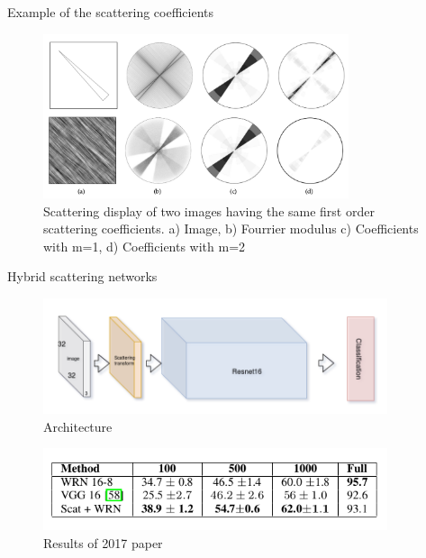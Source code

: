 \documentclass[compress]{beamer}
\begin{document}
	\begin{frame}{Example of the scattering coefficients}
		\begin{figure}[!htb]
			\includegraphics[width=0.8\textwidth]{images/scattering_coefficients_example.png}
			\caption{Scattering display of two images having the same first order scattering coefficients. a) Image, b) Fourrier modulus c) Coefficients with m=1, d) Coefficients with m=2}
		\end{figure}
	\end{frame}
	\begin{frame}{Hybrid scattering networks}
		\begin{figure}
			\includegraphics[width=0.9\textwidth]{images/arch_hybrid_scattering_CIFAR10.png}
			\caption{Architecture}
		\end{figure}
		\begin{figure}
			\includegraphics[width=0.9\textwidth]{images/results_hybrid_scattering_CIFAR10.png}
			\caption{Results of 2017 paper}
		\end{figure}
	\end{frame}
\end{document}
